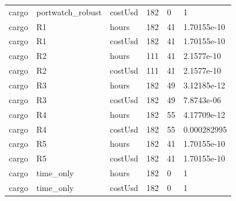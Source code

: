 \begin{tabular}{llllll}
cargo & portwatch\_robust & costUsd & 182 & 0 & 1 \\
cargo & R1 & hours & 182 & 41 & 1.70155e-10 \\
cargo & R1 & costUsd & 182 & 41 & 1.70155e-10 \\
cargo & R2 & hours & 111 & 41 & 2.1577e-10 \\
cargo & R2 & costUsd & 111 & 41 & 2.1577e-10 \\
cargo & R3 & hours & 182 & 49 & 3.12185e-12 \\
cargo & R3 & costUsd & 182 & 49 & 7.8743e-06 \\
cargo & R4 & hours & 182 & 55 & 4.17709e-12 \\
cargo & R4 & costUsd & 182 & 55 & 0.000282995 \\
cargo & R5 & hours & 182 & 41 & 1.70155e-10 \\
cargo & R5 & costUsd & 182 & 41 & 1.70155e-10 \\
cargo & time\_only & hours & 182 & 0 & 1 \\
cargo & time\_only & costUsd & 182 & 0 & 1 \\
\bottomrule
\end{tabular}
